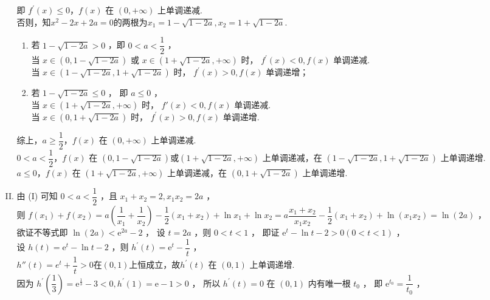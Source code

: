 \documentclass[11pt]{article}
\begin{document}
\begin{enumerate}
\begin{enumerate}[(I)]
		即 $f^{\prime}(x) \leq 0 ， f(x)$ 在 $(0,+\infty)$ 上单调递减.
		\\否则，知$ x^2-2x+2a=0 $的两根为$ x_1=1-\sqrt{1-2a} ,x_2=1+\sqrt{1-2a}  $.
		\begin{enumerate}
			\item 若 $1-\sqrt{1-2 a}>0$ ，即 $0<a<\dfrac{1}{2}$ ，
			\\当 $x \in(0,1-\sqrt{1-2 a})$ 或 $x \in(1+\sqrt{1-2 a},+\infty)$ 时， $f^{\prime}(x)<0 ,f(x)$ 单调递减.
			\\当 $x \in(1-\sqrt{1-2 a}, 1+\sqrt{1-2 a})$ 时， $f^{\prime}(x)>0 ,f(x)$ 单调递增；
			\item 若 $1-\sqrt{1-2 a} \leq 0$ ， 即 $a \leq 0$ ，
			\\当 $x \in(1+\sqrt{1-2 a},+\infty)$ 时， $f'(x)<0 , f(x)$ 单调递减.
			\\ 当 $x \in(0,1+\sqrt{1-2 a})$ 时， $f^{\prime}(x)>0 , f(x)$ 单调递增.
		\end{enumerate}
		综上，$a \geqslant \dfrac{1}{2} ， f(x)$ 在 $(0,+\infty)$ 上单调递减.
		\\$0<a<\dfrac{1}{2} ， f(x)$ 在 $(0,1-\sqrt{1-2 a}) $或$(1+\sqrt{1-2 a},+\infty)$ 上单调递减，在 $(1-\sqrt{1-2 a}, 1+\sqrt{1-2 a})$ 上单调递增.
		\\$a \leqslant 0 ， f(x)$ 在 $(1+\sqrt{1-2 a},+\infty)$ 上单调递减，在 $(0,1+\sqrt{1-2 a})$ 上单调递增.
		\item 
		由 (I) 可知 $0<a<\dfrac{1}{2}$ ，且 $x_{1}+x_{2}=2 , x_{1} x_{2}=2 a$ ，
		\\则 $f\left(x_{1}\right)+f\left(x_{2}\right)=a\left(\dfrac{1}{x_{1}}+\dfrac{1}{x_{2}}\right)-\dfrac{1}{2}\left(x_{1}+x_{2}\right)+\ln x_{1}+\ln x_{2}=a \dfrac{x_{1}+x_{2}}{x_{1} x_{2}}-\dfrac{1}{2}\left(x_{1}+x_{2}\right)+\ln \left(x_{1} x_{2}\right)=\ln (2 a)$ ，
		\\欲证不等式即 $\ln (2 a)<\mathrm{e}^{2 a}-2$ ，
		设 $t=2 a$ ，则 $0<t<1$ ， 即证 $\mathrm{e}^{t}-\ln t-2>0(0<t<1)$ ，
		\\设 $h(t)=\mathrm{e}^{t}-\ln t-2$ ，则 $h^{\prime}(t)=\mathrm{e}^{t}-\dfrac{1}{t}$ ，
		\\$ h''(t)=e^t+\dfrac{1}{t}>0 $在$ (0,1) $上恒成立，故$h^{\prime}(t)$ 在 $(0,1)$ 上单调递增.
		\\因为 $h^{\prime}\left(\dfrac{1}{3}\right)=\mathrm{e} ^{\frac{1}{3}}-3<0 , h^{\prime}(1)=\mathrm{e}-1>0$ ，
		所以 $h^{\prime}(t)=0$ 在 $(0,1)$ 内有唯一根 $t_{0}$ ， 即 $\mathrm{e}^{t_{0}}=\dfrac{1}{t_{0}}$ ，

\end{enumerate}
\end{enumerate}
\end{document}
